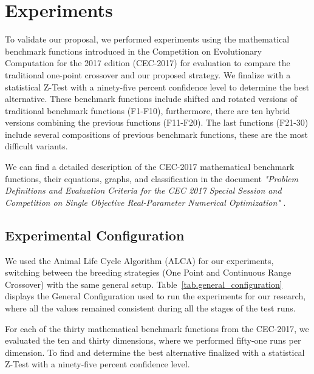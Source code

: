 \documentclass[graybox]{svmult}
\begin{document}
\section{Experiments}
    \label{section.experiments}

    To validate our proposal, we performed experiments using the mathematical benchmark functions introduced in the Competition on Evolutionary Computation\cite{awad2016problem} for the 2017 edition (CEC-2017) for evaluation to compare the traditional one-point crossover and our proposed strategy. We finalize with a statistical Z-Test with a ninety-five percent confidence level to determine the best alternative. These benchmark functions include shifted and rotated versions of traditional benchmark functions (F1-F10), furthermore, there are ten hybrid versions combining the previous functions (F11-F20). The last functions (F21-30) include several compositions of previous benchmark functions, these are the most difficult variants. 

    We can find a detailed description of the CEC-2017 mathematical benchmark functions, their equations, graphs, and classification in the document \textit{"Problem Definitions and Evaluation Criteria for the CEC 2017 Special Session and Competition on Single Objective Real-Parameter Numerical Optimization"} \cite{awad2016problem}.


    \subsection{Experimental Configuration}

    We used the Animal Life Cycle Algorithm (ALCA) for our experiments, switching between the breeding strategies (One Point and Continuous Range Crossover) with the same general setup. Table~\ref{tab.general_configuration} displays the General Configuration used to run the experiments for our research, where all the values remained consistent during all the stages of the test runs.

    For each of the thirty mathematical benchmark functions from the CEC-2017, we evaluated the ten and thirty dimensions, where we performed fifty-one runs per dimension. To find and determine the best alternative finalized with a statistical Z-Test with a ninety-five percent confidence level.
\end{document}
